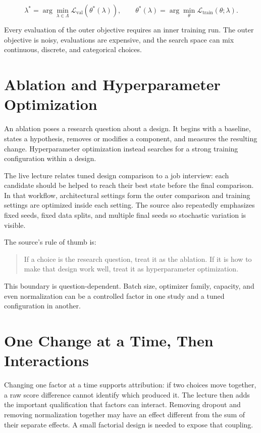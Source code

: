 \documentclass{article}
\begin{document}
\[
\lambda^*
=\arg\min_{\lambda\in\Lambda}
\mathcal{L}_{\mathrm{val}}\!\left(\theta^*(\lambda)\right),
\qquad
\theta^*(\lambda)
=\arg\min_{\theta}\mathcal{L}_{\mathrm{train}}(\theta;\lambda).
\]

Every evaluation of the outer objective requires an inner training run. The outer
objective is noisy, evaluations are expensive, and the search space can mix
continuous, discrete, and categorical choices.

\section{Ablation and Hyperparameter Optimization}

An ablation poses a research question about a design. It begins with a baseline,
states a hypothesis, removes or modifies a component, and measures the resulting
change. Hyperparameter optimization instead searches for a strong training
configuration within a design.

The live lecture relates tuned design comparison to a job interview: each candidate
should be helped to reach their best state before the final comparison. In that
workflow, architectural settings form the outer comparison and training settings are
optimized inside each setting. The source also repeatedly emphasizes fixed seeds,
fixed data splits, and multiple final seeds so stochastic variation is visible.

The source's rule of thumb is:

\begin{quote}
If a choice is the research question, treat it as the ablation. If it is how to make
that design work well, treat it as hyperparameter optimization.
\end{quote}

This boundary is question-dependent. Batch size, optimizer family, capacity, and even
normalization can be a controlled factor in one study and a tuned configuration in
another.

\section{One Change at a Time, Then Interactions}

Changing one factor at a time supports attribution: if two choices move together, a
raw score difference cannot identify which produced it. The lecture then adds the
important qualification that factors can interact. Removing dropout and removing
normalization together may have an effect different from the sum of their separate
effects. A small factorial design is needed to expose that coupling.
\end{document}
